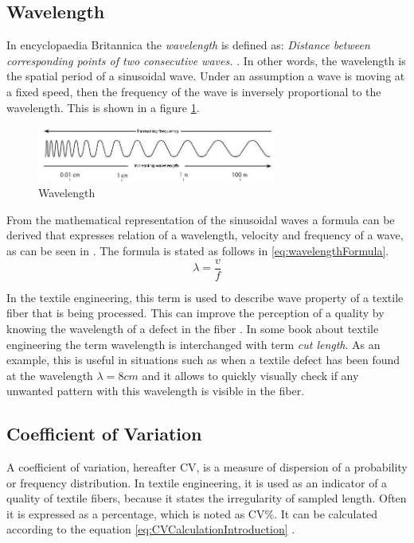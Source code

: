 \documentclass[twoside]{ctuthesis}
\theoremstyle{plain}
\theoremstyle{definition}
\theoremstyle{note}
\begin{document}
\subsection{Wavelength}
In encyclopaedia Britannica the \textit{wavelength} is defined as:
\textit{Distance between corresponding points of two consecutive waves.} \cite{cite:brittanicaWavelength}. In other words, the wavelength is the spatial period of a sinusoidal wave. Under an assumption a wave is moving at a fixed speed, then the frequency of the wave is inversely proportional to the wavelength. This is shown in a figure \ref{fig:wavelengthExplaination}.
\begin{figure}[h]
	\centering
	\includegraphics[width=0.7\textwidth]{wavelengt_explained.jpg}
	\caption{Wavelength}
	\label{fig:wavelengthExplaination}
\end{figure}

From the mathematical representation of the sinusoidal waves a formula can be derived that expresses relation of a wavelength, velocity and frequency of a wave, as can be seen in \cite{cite:fundamentalsOfPhysics}. The formula is stated as follows in \ref{eq:wavelengthFormula}.
\begin{equation} \label{eq:wavelengthFormula}
\lambda=\frac{v}{f}
\end{equation}

In the textile engineering, this term is used to describe wave property of a textile fiber that is being processed. This can improve the perception of a quality by knowing the wavelength of a defect in the fiber \cite{cite:TextileEngineering}. In some book about textile engineering the term wavelength is interchanged with term \textit{cut length}. As an example, this is useful in situations such as when a textile defect has been found at the wavelength $\lambda=8cm$ and it allows to quickly visually check if any unwanted pattern with this wavelength is visible in the fiber.

\subsection{Coefficient of Variation}
\label{sec:CoefficientOfvariation}
A coefficient of variation, hereafter CV, is a measure of dispersion of a probability or frequency distribution. In textile engineering, it is used as an indicator of a quality of textile fibers, because it states the irregularity of sampled length. Often it is expressed as a percentage, which is noted as CV\%. It can be calculated according to the equation \ref{eq:CVCalculationIntroduction} \cite{cite:fundamentalsOfSpunYarn}.
\end{document}
